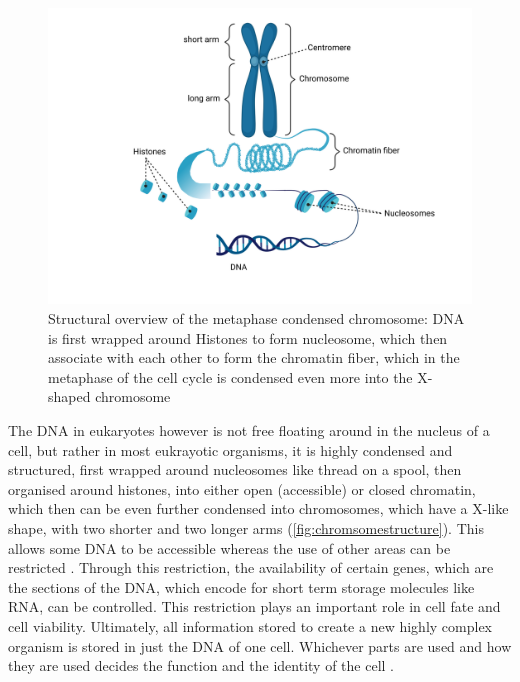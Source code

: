 \begin{figure}[!ht]
\centering
\includegraphics[width=0.9\linewidth]{Figures/intro/ChromosomeStructure}
\caption[Overview Chromosome structure]{Structural overview of the metaphase condensed chromosome: DNA is first wrapped around Histones to form nucleosome, which then associate with each other to form the chromatin fiber, which in the metaphase of the cell cycle is condensed even more into the X-shaped chromosome}\label{fig:chromsomestructure}
\end{figure}

The DNA in eukaryotes however is not free floating around in the nucleus of a cell, but rather in most eukrayotic organisms, it is highly condensed and structured, first wrapped around nucleosomes like thread on a spool, then organised around histones, into either open (accessible) or closed chromatin, which then can be even further condensed into chromosomes, which have a X-like shape, with two shorter and two longer arms (\autoref{fig:chromsomestructure}). This allows some DNA to be accessible whereas the use of other areas can be restricted \cite{Hammond2017}. Through this restriction, the availability of certain genes, which are the sections of the DNA, which encode for short term storage molecules like RNA, can be controlled. This restriction plays an important role in cell fate and cell viability. Ultimately, all information stored to create a new highly complex organism is stored in just the DNA of one cell. Whichever parts are used and how they are used decides the function and the identity of the cell \cite{Bonev2016}. 


